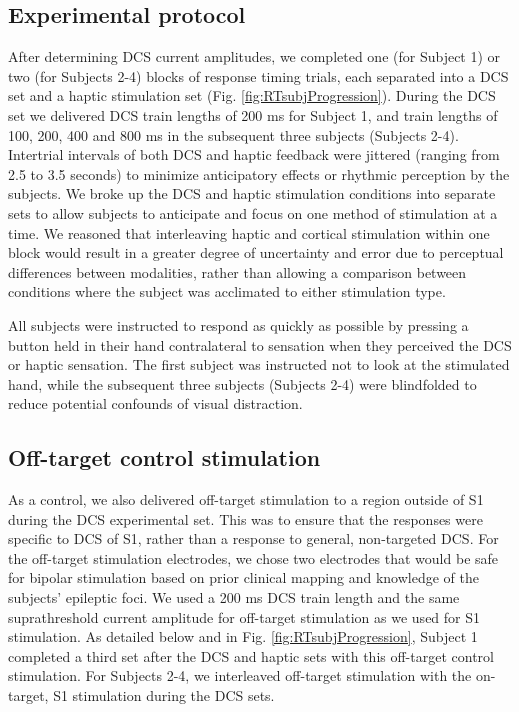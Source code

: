 \subsection{Experimental protocol}
 
 
 After determining DCS current amplitudes, we completed one (for Subject 1) or two (for Subjects 2-4) blocks of response timing trials, each separated into a DCS set and a haptic stimulation set (Fig. \ref{fig:RTsubjProgression}). During the DCS set we delivered DCS train lengths of 200 ms for Subject 1, and train lengths of 100, 200, 400 and 800 ms in the subsequent three subjects (Subjects 2-4). Intertrial intervals of both DCS and haptic feedback were jittered (ranging from 2.5 to 3.5 seconds) to minimize anticipatory effects or rhythmic perception by the subjects. We broke up the DCS and haptic stimulation conditions into separate sets to allow subjects to anticipate and focus on one method of stimulation at a time. We reasoned that interleaving haptic and cortical stimulation within one block would result in a greater degree of uncertainty and error due to perceptual differences between modalities, rather than allowing a comparison between conditions where the subject was acclimated to either stimulation type.
 
 All subjects were instructed to respond as quickly as possible by pressing a button held in their hand contralateral to sensation when they perceived the DCS or haptic sensation. The first subject was instructed not to look at the stimulated hand, while the subsequent three subjects (Subjects 2-4) were blindfolded to reduce potential confounds of visual distraction.
 
 
\subsection{ Off-target control stimulation}

As a control, we also delivered off-target stimulation to a region outside of S1 during the DCS experimental set. This was to ensure that the responses were specific to DCS of S1, rather than a response to general, non-targeted DCS. For the off-target stimulation electrodes, we chose two electrodes that would be safe for bipolar stimulation based on prior clinical mapping and knowledge of the subjects’ epileptic foci. We used a 200 ms DCS train length and the same suprathreshold current amplitude for off-target stimulation as we used for S1 stimulation. As detailed below and in Fig. \ref{fig:RTsubjProgression}, Subject 1 completed a third set after the DCS and haptic sets with this off-target control stimulation. For Subjects 2-4, we interleaved off-target stimulation with the on-target, S1 stimulation during the DCS sets.
 
